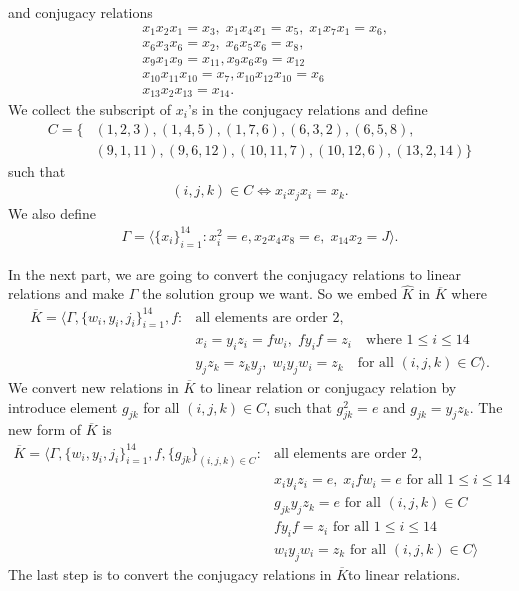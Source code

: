 \documentclass[11pt,letterpaper]{article}
\newcommand{\1}{\mathbb{1}}
\theoremstyle{definition}
\begin{document}
and conjugacy relations
\begin{align*}
	&x_1x_2x_1 =x_3, \;x_1x_4x_1 =x_5,\; x_1x_7x_1 =x_6,\\
	&x_6x_3x_6 =x_2, \;x_6x_5x_6 =x_8,\\
	&x_9x_1x_9 = x_{11},x_9x_6x_9 = x_{12}\\
	&x_{10}x_{11}x_{10} = x_7,x_{10}x_{12}x_{10} = x_6\\
	&x_{13}x_2x_{13} = x_{14}.
\end{align*}
We collect the subscript of $x_i$'s in the conjugacy relations and define
\begin{align}
	C= \{ &(1,2,3), (1,4,5), (1,7,6), (6,3,2), (6,5,8),\\
	&(9,1,11),(9,6,12),(10,11,7),(10,12,6),(13,2,14)\}
\end{align}
such that
\begin{align*}
	(i,j,k) \in C \Longleftrightarrow x_ix_jx_i = x_k.
\end{align*}
We also define 
\begin{align}
	\Gamma = \langle \{x_i\}_{i=1}^{14} : x_i^2 = e, x_2x_4x_8 = e,\; x_{14}x_{2} = J \rangle.
\end{align}

In the next part, we are going to convert the conjugacy relations to linear relations
and make $\Gamma$ the solution group we want.
So we embed $\hat{K}$ in $\overline{K}$ where 
\begin{align*}
	\overline{K} = \langle \Gamma, \{w_i, y_i, j_i\}_{i=1}^{14}, f:&\text{all elements are order $2$},\\
	&x_i = y_iz_i = fw_i,\; fy_if =z_i \quad\text{where } 1 \leq i \leq 14 \\
	&y_j z_k = z_ky_j,\; w_iy_jw_i = z_k \quad\text{for all } (i,j,k)\in C \rangle.
\end{align*}
We convert new relations in $\overline{K}$ to linear relation or conjugacy relation by introduce 
element $g_{jk}$ for all $(i,j,k) \in C$, such that $g_{jk}^2 = e$ and $g_{jk} = y_j z_k$.
The new form of $\overline{K}$ is 
\begin{equation}
\begin{split}
	\overline{K} = \langle \Gamma, \{w_i, y_i, j_i\}_{i=1}^{14}, f, \{g_{jk}\}_{(i,j,k) \in C} :&\text{all elements are order $2$},\\
	&x_iy_iz_i = e,\; x_ifw_i = e\text{ for all } 1 \leq i \leq 14\\
	&g_{jk} y_j z_k = e \text{ for all } (i,j,k) \in C\\
	&fy_if = z_i \text{ for all } 1 \leq i \leq 14 \\
	&w_iy_jw_i = z_k  \text{ for all } (i,j,k) \in C \rangle
\end{split}
\end{equation}
The last step is to convert the conjugacy relations in $\overline{K}$to linear relations.
\end{document}
